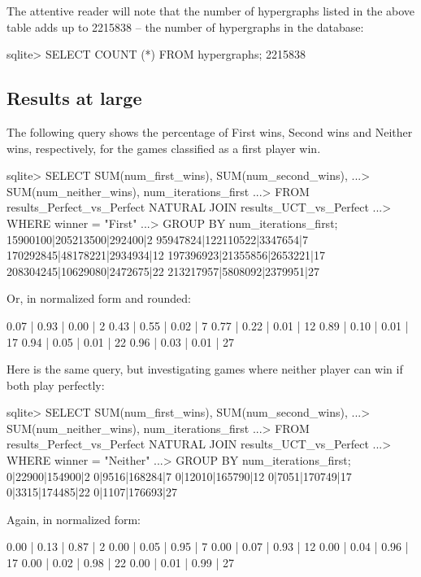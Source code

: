 The attentive reader will note that the number of hypergraphs listed in the above table adds up to 2215838 -- the number of hypergraphs in the database:
\begin{code}
sqlite> SELECT COUNT (*) FROM hypergraphs;
2215838
\end{code}

\subsection{Results at large}
\label{sec:results_at_large}

The following query shows the percentage of First wins, Second wins and Neither wins, respectively, for the games classified as a first player win.
\begin{code}
sqlite> SELECT SUM(num_first_wins), SUM(num_second_wins),
   ...>        SUM(num_neither_wins), num_iterations_first
   ...> FROM results_Perfect_vs_Perfect NATURAL JOIN results_UCT_vs_Perfect
   ...> WHERE winner = "First"
   ...> GROUP BY num_iterations_first;
15900100|205213500|292400|2
95947824|122110522|3347654|7
170292845|48178221|2934934|12
197396923|21355856|2653221|17
208304245|10629080|2472675|22
213217957|5808092|2379951|27
\end{code}
Or, in normalized form and rounded:
\begin{code}
0.07 | 0.93 | 0.00 | 2
0.43 | 0.55 | 0.02 | 7
0.77 | 0.22 | 0.01 | 12
0.89 | 0.10 | 0.01 | 17
0.94 | 0.05 | 0.01 | 22
0.96 | 0.03 | 0.01 | 27
\end{code}

Here is the same query, but investigating games where neither player can win if both play perfectly:

\begin{code}
sqlite> SELECT SUM(num_first_wins), SUM(num_second_wins),
   ...>        SUM(num_neither_wins), num_iterations_first
   ...> FROM results_Perfect_vs_Perfect NATURAL JOIN results_UCT_vs_Perfect
   ...> WHERE winner = "Neither"
   ...> GROUP BY num_iterations_first;
0|22900|154900|2
0|9516|168284|7
0|12010|165790|12
0|7051|170749|17
0|3315|174485|22
0|1107|176693|27
\end{code}

Again, in normalized form:

\begin{code}
0.00 | 0.13 | 0.87 | 2
0.00 | 0.05 | 0.95 | 7
0.00 | 0.07 | 0.93 | 12
0.00 | 0.04 | 0.96 | 17
0.00 | 0.02 | 0.98 | 22
0.00 | 0.01 | 0.99 | 27
\end{code}


